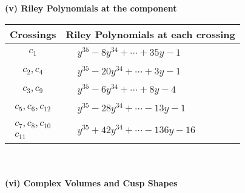 \documentclass[1p]{elsarticle_modified}
\theoremstyle{definition}
\begin{document}
\newpage\renewcommand{\arraystretch}{1}
\flushleft \textbf{(v) Riley Polynomials at the component}\newline \\
\begin{tabular}{m{50pt}|m{274pt}}
Crossings & \hspace{64pt}Riley Polynomials at each crossing \\
\hline $$\begin{aligned}c_{1}\end{aligned}$$&$\begin{aligned}
&y^{35}-8 y^{34}+\cdots+35 y-1
\end{aligned}$\\
\hline $$\begin{aligned}c_{2},c_{4}\end{aligned}$$&$\begin{aligned}
&y^{35}-20 y^{34}+\cdots+3 y-1
\end{aligned}$\\
\hline $$\begin{aligned}c_{3},c_{9}\end{aligned}$$&$\begin{aligned}
&y^{35}-6 y^{34}+\cdots+8 y-4
\end{aligned}$\\
\hline $$\begin{aligned}c_{5},c_{6},c_{12}\end{aligned}$$&$\begin{aligned}
&y^{35}-28 y^{34}+\cdots-13 y-1
\end{aligned}$\\
\hline $$\begin{aligned}c_{7},c_{8},c_{10}\\c_{11}\end{aligned}$$&$\begin{aligned}
&y^{35}+42 y^{34}+\cdots-136 y-16
\end{aligned}$\\
\hline
\end{tabular}\\~\\
\newpage\flushleft \textbf{(vi) Complex Volumes and Cusp Shapes}
\end{document}
